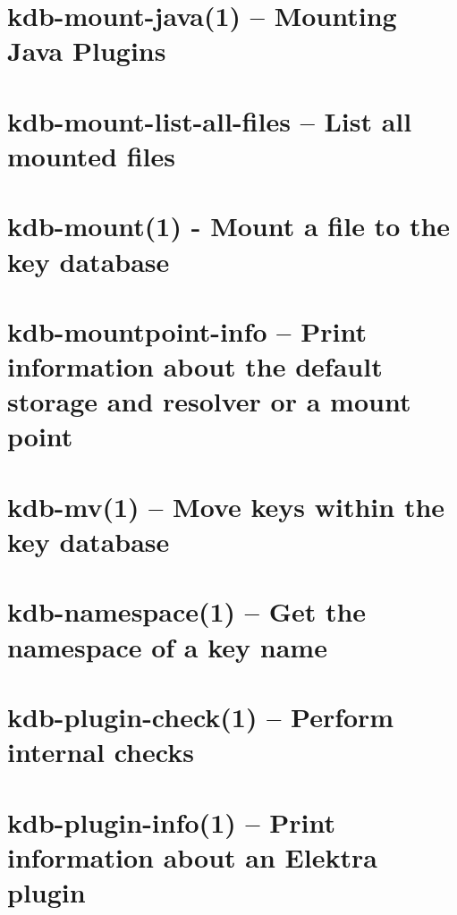 \let\mypdfximage\pdfximage\def\pdfximage{\immediate\mypdfximage}\documentclass[twoside]{book}
\newcommand{\+}{\discretionary{\mbox{\scriptsize$\hookleftarrow$}}{}{}}
\begin{document}
\chapter{kdb-\/mount-\/java(1) -- Mounting Java Plugins}
\label{doc_help_kdb-mount-java_md}

\chapter{kdb-\/mount-\/list-\/all-\/files -- List all mounted files}
\label{doc_help_kdb-mount-list-all-files_md}

\chapter{kdb-\/mount(1) -\/ Mount a file to the key database}
\label{doc_help_kdb-mount_md}

\chapter{kdb-\/mountpoint-\/info -- Print information about the default storage and resolver or a mount point}
\label{doc_help_kdb-mountpoint-info_md}

\chapter{kdb-\/mv(1) -- Move keys within the key database}
\label{doc_help_kdb-mv_md}

\chapter{kdb-\/namespace(1) -- Get the namespace of a key name}
\label{doc_help_kdb-namespace_md}

\chapter{kdb-\/plugin-\/check(1) -- Perform internal checks}
\label{doc_help_kdb-plugin-check_md}

\chapter{kdb-\/plugin-\/info(1) -- Print information about an Elektra plugin}
\label{doc_help_kdb-plugin-info_md}

\end{document}
